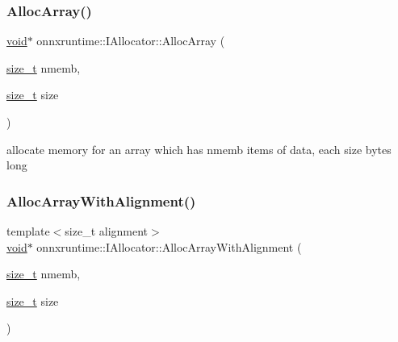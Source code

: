 \mbox{\label{classonnxruntime_1_1IAllocator_a9692f660ab4bd7ef7736ee38c71e5970}} 
\subsubsection{\texorpdfstring{Alloc\+Array()}{AllocArray()}}
{\footnotesize\ttfamily \mbox{\hyperlink{mlasi_8h_a88f941d423cb2a819b70a1358982b1a6}{void}}$\ast$ onnxruntime\+::\+I\+Allocator\+::\+Alloc\+Array (\begin{DoxyParamCaption}\item[{\mbox{\hyperlink{mlasi_8h_a503efbc1c6e50825320ad909366b78ab}{size\+\_\+t}}}]{nmemb,  }\item[{\mbox{\hyperlink{mlasi_8h_a503efbc1c6e50825320ad909366b78ab}{size\+\_\+t}}}]{size }\end{DoxyParamCaption})\hspace{0.3cm}{\ttfamily [inline]}}

allocate memory for an array which has nmemb items of data, each size bytes long \mbox{\label{classonnxruntime_1_1IAllocator_a228f7213f74cc1fd27c0767f51ec3c8e}} 
\subsubsection{\texorpdfstring{Alloc\+Array\+With\+Alignment()}{AllocArrayWithAlignment()}}
{\footnotesize\ttfamily template$<$size\+\_\+t alignment$>$ \\
\mbox{\hyperlink{mlasi_8h_a88f941d423cb2a819b70a1358982b1a6}{void}}$\ast$ onnxruntime\+::\+I\+Allocator\+::\+Alloc\+Array\+With\+Alignment (\begin{DoxyParamCaption}\item[{\mbox{\hyperlink{mlasi_8h_a503efbc1c6e50825320ad909366b78ab}{size\+\_\+t}}}]{nmemb,  }\item[{\mbox{\hyperlink{mlasi_8h_a503efbc1c6e50825320ad909366b78ab}{size\+\_\+t}}}]{size }\end{DoxyParamCaption})\hspace{0.3cm}{\ttfamily [inline]}}

